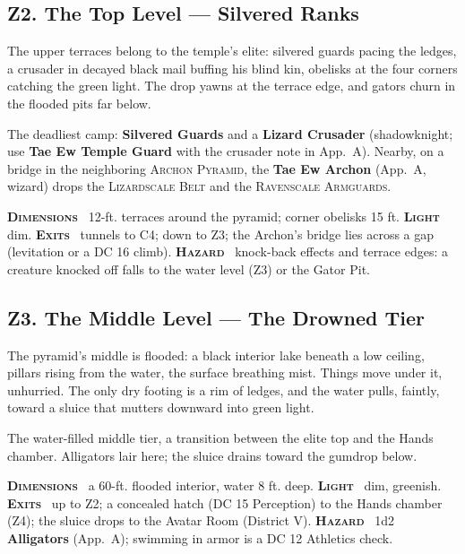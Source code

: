 \documentclass[10pt,twoside]{article}
\newcommand{\tech}[1]{\textbf{\scshape\textcolor{stone}{#1}}\ }
\newcommand{\eqname}[1]{\textsc{#1}}
\begin{document}
\subsection{Z2. The Top Level --- Silvered Ranks}
\begin{readaloud}
The upper terraces belong to the temple's elite: silvered guards pacing the ledges,
a crusader in decayed black mail buffing his blind kin, obelisks at the four corners
catching the green light. The drop yawns at the terrace edge, and gators churn in the
flooded pits far below.
\end{readaloud}
The deadliest camp: \textbf{Silvered Guards} and a \textbf{Lizard Crusader}
(shadowknight; use \textbf{Tae Ew Temple Guard} with the crusader note in App.\ A).
Nearby, on a bridge in the neighboring \eqname{Archon Pyramid}, the \textbf{Tae Ew
Archon} (App.\ A, wizard) drops the \eqname{Lizardscale Belt} and the
\eqname{Ravenscale Armguards}.

\begin{techbox}
\tech{Dimensions} 12-ft. terraces around the pyramid; corner obelisks 15 ft.
\tech{Light} dim. \tech{Exits} tunnels to C4; down to Z3; the Archon's bridge lies
across a gap (levitation or a DC 16 climb). \tech{Hazard} knock-back effects and
terrace edges: a creature knocked off falls to the water level (Z3) or the Gator Pit.
\end{techbox}

\subsection{Z3. The Middle Level --- The Drowned Tier}
\begin{readaloud}
The pyramid's middle is flooded: a black interior lake beneath a low ceiling, pillars
rising from the water, the surface breathing mist. Things move under it, unhurried.
The only dry footing is a rim of ledges, and the water pulls, faintly, toward a sluice
that mutters downward into green light.
\end{readaloud}
The water-filled middle tier, a transition between the elite top and the Hands
chamber. Alligators lair here; the sluice drains toward the gumdrop below.

\begin{techbox}
\tech{Dimensions} a 60-ft. flooded interior, water 8 ft. deep. \tech{Light} dim,
greenish. \tech{Exits} up to Z2; a concealed hatch (DC 15 Perception) to the Hands
chamber (Z4); the sluice drops to the Avatar Room (District V). \tech{Hazard} 1d2
\textbf{Alligators} (App.\ A); swimming in armor is a DC 12 Athletics check.
\end{techbox}
\end{document}
